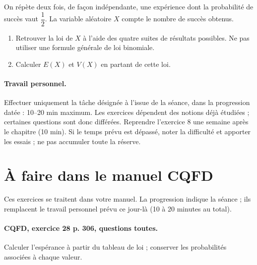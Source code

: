 On répète deux fois, de façon indépendante, une expérience dont la probabilité de succès vaut $\dfrac12$. La variable aléatoire $X$ compte le nombre de succès obtenus.
\begin{enumerate}[label=\arabic*.]
\item Retrouver la loi de $X$ à l’aide des quatre suites de résultats possibles. Ne pas utiliser une formule générale de loi binomiale.
\item Calculer $E(X)$ et $V(X)$ en partant de cette loi.
\end{enumerate}
\paragraph{Travail personnel.} Effectuer uniquement la tâche désignée à l’issue de la séance, dans la progression datée : 10–20 min maximum. Les exercices dépendent des notions déjà étudiées ; certaines questions sont donc différées. Reprendre l’exercice 8 une semaine après le chapitre (10 min). Si le temps prévu est dépassé, noter la difficulté et apporter les essais ; ne pas accumuler toute la réserve.
\endgroup
{}\section*{À faire dans le manuel CQFD}
Ces exercices se traitent dans votre manuel. La progression indique la séance ; ils remplacent le travail personnel prévu ce jour-là (10 à 20 minutes au total).
\paragraph{CQFD, exercice 28 p. 306, questions toutes.}\label{C08-M1} Calculer l’espérance à partir du tableau de loi ; conserver les probabilités associées à chaque valeur.
